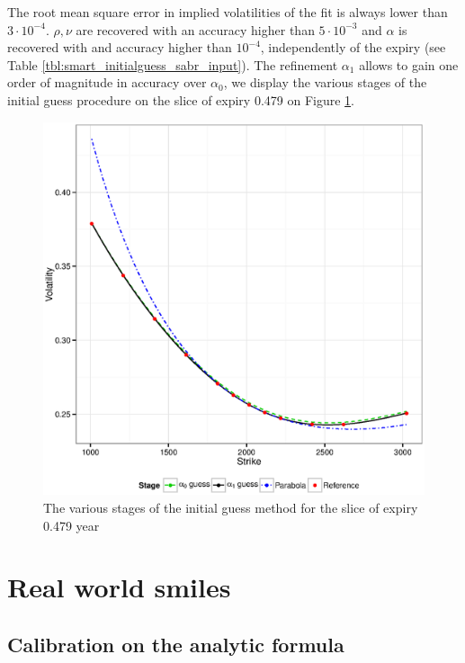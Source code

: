 \documentclass[]{rAMF2e}
\begin{document}
The root mean square error in implied volatilities of the fit is always lower than $3\cdot 10^{-4}$. $\rho, \nu$ are recovered with an accuracy higher than $5\cdot 10^{-3}$ and $\alpha$ is recovered with and accuracy higher than $10^{-4}$, independently of the expiry (see Table \ref{tbl:smart_initialguess_sabr_input}). The refinement $\alpha_1$ allows to gain one order of magnitude in accuracy over $\alpha_0$, we display the various stages of the initial guess procedure on the slice of expiry 0.479 on Figure \ref{fig:smart_initialguess_sabr_input}.
\begin{figure}[h]
  \caption{\label{fig:smart_initialguess_sabr_input}The various stages of the initial guess method for the slice of expiry 0.479 year}
\begin{center}
 \includegraphics[width=16cm]{explicit_fit_sabr_0479_beta1.eps}
\end{center}
\end{figure}

\section{Real world smiles}
\subsection{Calibration on the analytic formula}
\end{document}
